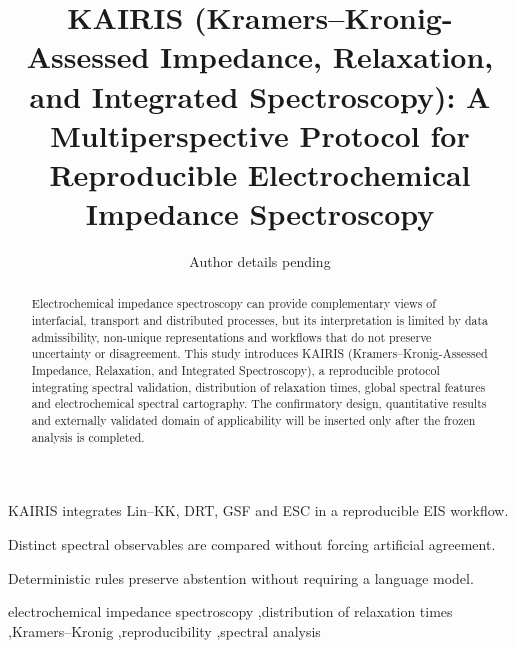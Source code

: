 \documentclass[a4paper,fleqn]{cas-sc}
\begin{document}
\let\WriteBookmarks\relax
\def\floatpagepagefraction{1}
\def\textpagefraction{.001}


\title[mode=title]{KAIRIS (Kramers--Kronig-Assessed Impedance, Relaxation,
and Integrated Spectroscopy): A Multiperspective Protocol for Reproducible
Electrochemical Impedance Spectroscopy}

\author[1]{Author details pending}
\cormark[1]



\begin{abstract}
Electrochemical impedance spectroscopy can provide complementary views of
interfacial, transport and distributed processes, but its interpretation is
limited by data admissibility, non-unique representations and workflows that do
not preserve uncertainty or disagreement. This study introduces KAIRIS
(Kramers--Kronig-Assessed Impedance, Relaxation, and Integrated Spectroscopy), a
reproducible protocol integrating spectral validation, distribution of
relaxation times, global spectral features and electrochemical spectral
cartography. The confirmatory design, quantitative results and externally
validated domain of applicability will be inserted only after the frozen
analysis is completed.
\end{abstract}

\begin{highlights}
\item KAIRIS integrates Lin--KK, DRT, GSF and ESC in a reproducible EIS workflow.
\item Distinct spectral observables are compared without forcing artificial agreement.
\item Deterministic rules preserve abstention without requiring a language model.
\end{highlights}

\begin{keywords}
electrochemical impedance spectroscopy \sep distribution of relaxation times
\sep Kramers--Kronig \sep reproducibility \sep spectral analysis
\end{keywords}

\maketitle
\end{document}

